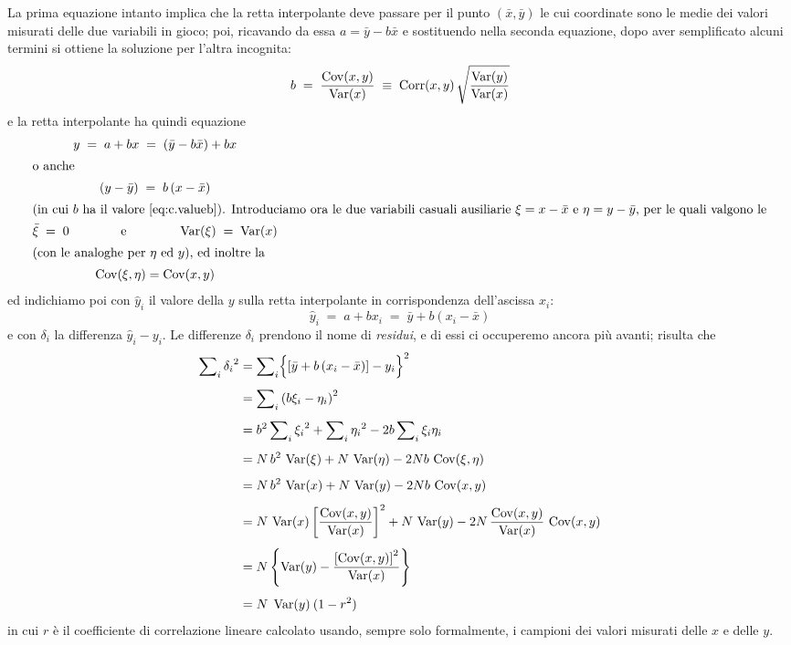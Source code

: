 La prima equazione intanto implica che la retta interpolante
deve passare per il punto $(\bar x, \bar y)$ le cui
coordinate sono le medie dei valori misurati delle due
variabili in gioco; poi, ricavando da essa $a = \bar y - b
\bar x$ e sostituendo nella seconda equazione, dopo aver
semplificato alcuni termini si ottiene la soluzione per
l'altra incognita:
\begin{equation} \label{eq:c.valueb}
  b \; = \; \frac{\operatorname{Cov} (x, y)}{ \operatorname{Var} (x) } \;
    \equiv \; \operatorname{Corr}(x,y) \, \sqrt{ \frac{\operatorname{Var}(y)}
    {\operatorname{Var}(x)} }
\end{equation}
e la retta interpolante ha quindi equazione
\begin{gather*}
  y \; = \; a + bx \; = \; \left( \bar y - b \bar x
    \right) + b x \\
  \intertext{o anche}
  \left( y - \bar y \right) \; = \; b \left(
    x - \bar x \right) \\
  \intertext{(in cui $b$ ha il valore
    \eqref{eq:c.valueb}).
    Introduciamo ora le due variabili casuali
    ausiliarie $\xi = x - \bar x $ e $\eta = y
    - \bar y$, per le quali valgono le}
  \bar \xi \; = \; 0
    \makebox[30mm]{e}
    \var (\xi) \; = \; \var (x) \\
  \intertext{(con le analoghe per $\eta$ ed $y $),
    ed inoltre la}
  \cov (\xi, \eta) = \cov (x, y)
\end{gather*}
ed indichiamo poi con $\widehat y_i$ il valore della $y$
sulla retta interpolante in corrispondenza dell'ascissa $x_i
$:
\begin{equation} \label{eq:c.resid}
  \widehat y_i \; = \; a + b x_i \; = \;
    \bar y + b \left( x_i - \bar x \right)
\end{equation}
e con $\delta_i$ la differenza $\widehat y_i - y_i $.  Le
differenze $\delta_i$ prendono il nome di \emph{residui},%
e di essi ci occuperemo ancora pi\`u avanti; risulta che
\begin{align*}
  \sum\nolimits_i {\delta_i}^2 &= \sum\nolimits_i \Bigl \{ \left[
    \bar y + b \left( x_i - \bar x \right) \right]
    - y_i \Bigr \} ^2 \\[1ex]
  &= \sum\nolimits_i \left( b \xi_i - \eta_i \right) ^2
    \\[1ex]
  &= b^2 \sum\nolimits_i {\xi_i}^2 + \sum\nolimits_i {\eta_i}^2
    - 2 b \sum\nolimits_i \xi_i \eta_i \\[1ex]
  &= N \, b^2 \, \operatorname{Var}(\xi) + N \, \operatorname{Var}(\eta)
    - 2 N b \, \operatorname{Cov}(\xi, \eta) \\[1ex]
  &= N \, b^2 \, \operatorname{Var}(x) + N \, \operatorname{Var}(y)
    - 2 N b \, \operatorname{Cov}(x, y) \\[1ex]
  &= N \, \operatorname{Var}(x) \left[ \frac{ \operatorname{Cov}(x, y) }
    { \operatorname{Var}(x) } \right] ^2
    + N \, \operatorname{Var}(y) - 2 N \, \frac{ \operatorname{Cov}(x, y) }
    { \operatorname{Var}(x) } \, \operatorname{Cov}(x, y) \\[1ex]
  &= N \left\{ \operatorname{Var}(y)
    - \frac{ \left[ \operatorname{Cov}(x, y) \right] ^2 }
    { \operatorname{Var}(x) } \right\} \\[1ex]
  &= N \; \operatorname{Var}(y) \: ( 1 - r^2 )
\end{align*}%
in cui $r$ \`e il coefficiente di correlazione lineare
calcolato usando, sempre solo formalmente, i campioni dei
valori misurati delle $x$ e delle $y$.

